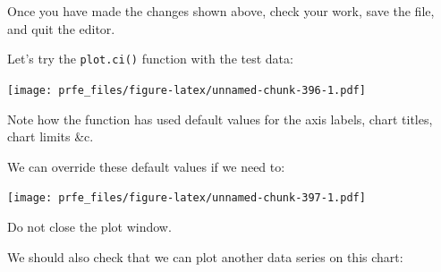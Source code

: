 \documentclass[12pt,]{book}
\newenvironment{Shaded}{\begin{snugshade}}{\end{snugshade}}
\newcommand{\KeywordTok}[1]{\textcolor[rgb]{0.13,0.29,0.53}{\textbf{#1}}}
\newcommand{\DataTypeTok}[1]{\textcolor[rgb]{0.13,0.29,0.53}{#1}}
\newcommand{\DecValTok}[1]{\textcolor[rgb]{0.00,0.00,0.81}{#1}}
\newcommand{\StringTok}[1]{\textcolor[rgb]{0.31,0.60,0.02}{#1}}
\newcommand{\OtherTok}[1]{\textcolor[rgb]{0.56,0.35,0.01}{#1}}
\newcommand{\OperatorTok}[1]{\textcolor[rgb]{0.81,0.36,0.00}{\textbf{#1}}}
\newcommand{\NormalTok}[1]{#1}
\theoremstyle{definition}
\theoremstyle{definition}
\theoremstyle{definition}
\theoremstyle{remark}
\begin{document}
Once you have made the changes shown above, check your work, save the
file, and quit the editor.

Let's try the \texttt{plot.ci()} function with the test data:

\begin{Shaded}
\end{Shaded}

\texttt{[image: prfe\_files/figure-latex/unnamed-chunk-396-1.pdf]}

Note how the function has used default values for the axis labels, chart
titles, chart limits \&c.

We can override these default values if we need to:

\begin{Shaded}
\end{Shaded}

\texttt{[image: prfe\_files/figure-latex/unnamed-chunk-397-1.pdf]}

Do not close the plot window.

We should also check that we can plot another data series on this chart:

\begin{Shaded}
\end{Shaded}
\end{document}

